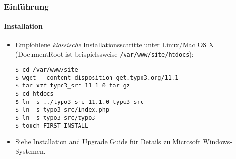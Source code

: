 %

\begin{frame}[fragile]
	\frametitle{Einführung}
	\framesubtitle{Installation}


	\begin{itemize}
		\item Empfohlene \textit{klassische} Installationsschritte unter Linux/Mac OS X\newline
			(DocumentRoot ist beispielssweise \texttt{/var/www/site/htdocs}):
\begin{lstlisting}
$ cd /var/www/site
$ wget --content-disposition get.typo3.org/11.1
$ tar xzf typo3_src-11.1.0.tar.gz
$ cd htdocs
$ ln -s ../typo3_src-11.1.0 typo3_src
$ ln -s typo3_src/index.php
$ ln -s typo3_src/typo3
$ touch FIRST_INSTALL
\end{lstlisting}

		\item Siehe \href{https://docs.typo3.org/m/typo3/guide-installation/master/en-us/}{Installation and Upgrade Guide}
			 für Details zu Microsoft Windows-Systemen.

	\end{itemize}
\end{frame}

